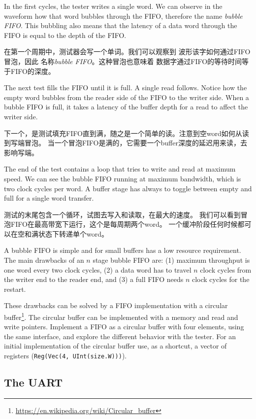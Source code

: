 \documentclass[%
    10pt,
    headinclude, footexclude,
    openright, %
    notitlepage,
    cleardoubleempty,
    headsepline,
    pointlessnumbers,
    bibtotoc, idxtotoc,
    ]{scrbook}
\newcommand{\code}[1]{{\small{\texttt{#1}}}}
\newcommand{\myref}[2]{\href{#1}{#2}}
\renewcommand{\myref}[2]{{#2}{\footnote{\url{#1}}}}
\begin{document}
{In the first cycles, the tester writes a single word. We can observe in
the waveform how that word bubbles through the FIFO, therefore the
name \emph{bubble FIFO}. This bubbling also means that the
latency of a data word through the FIFO is equal to the depth of the FIFO.

在第一个周期中，测试器会写一个单词。我们可以观察到
波形该字如何通过FIFO冒泡，因此
名称\emph{bubble FIFO}。这种冒泡也意味着
数据字通过FIFO的等待时间等于FIFO的深度。

The next test fills the FIFO until it is full. A single read follows.
Notice how the empty word bubbles from the reader side of the FIFO
to the writer side. When a bubble FIFO is full, it takes
a latency of the buffer depth for a read to affect the writer side. 

下一个，是测试填充FIFO直到满，随之是一个简单的读。注意到空word如何从读到写端冒泡。
当一个冒泡FIFO是满的，它需要一个buffer深度的延迟用来读，去影响写端。

The end of the test contains a loop that tries to write and read at maximum speed.
We can see the bubble FIFO running at maximum bandwidth, which is two
clock cycles per word. A buffer stage has always to toggle between empty
and full for a single word transfer.

测试的末尾包含一个循环，试图去写入和读取，在最大的速度。
我们可以看到冒泡FIFO在最高带宽下运行，这个是每周期两个word。
一个缓冲阶段任何时候都可以在空和满状态下转递单个word。

A bubble FIFO is simple and for small buffers has a low resource requirement.
The main drawbacks of an $n$ stage bubble FIFO are: (1) maximum throughput is
one word every two clock cycles, (2) a data word has to travel $n$ clock cycles
from the writer end to the reader end, and (3) a full FIFO needs $n$ clock cycles
for the restart.

These drawbacks can be solved by a FIFO implementation with a
\myref{https://en.wikipedia.org/wiki/Circular_buffer}{circular buffer}.
The circular buffer can be implemented with a memory and
read and write pointers.
Implement a FIFO as a circular buffer with four elements, using the same
interface, and explore the different behavior with the tester.
For an initial implementation of the circular buffer use, as a shortcut,
a vector of registers (\code{Reg(Vec(4, UInt(size.W)))}).

\subsection{The UART}

}
\end{document}
